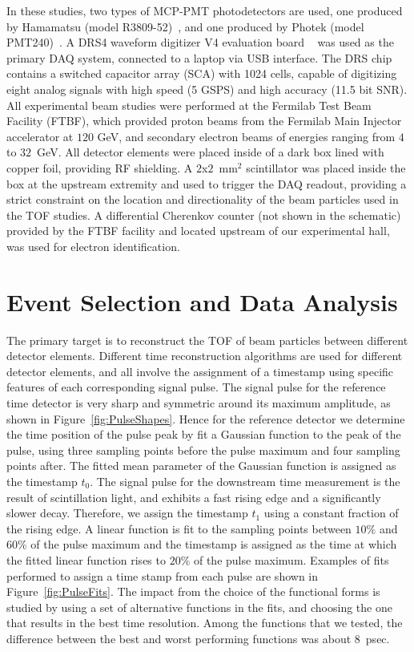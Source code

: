 In these studies, two types of MCP-PMT photodetectors are used, one produced by Hamamatsu 
(model R3809-52)~\cite{HamamatsuMCP3809}, and one produced by Photek (model
PMT240)~\cite{Photek240}. A DRS4  waveform digitizer V4 evaluation
board ~\cite{DRS4} was used as the primary DAQ system, connected to a laptop via
USB interface.  The DRS chip contains a switched capacitor array (SCA) with 1024 cells, 
capable of digitizing eight analog signals with high speed (5 GSPS) and high 
accuracy (11.5 bit SNR). All experimental beam studies were performed at the Fermilab Test
Beam Facility (FTBF), which provided proton beams from the Fermilab Main
Injector accelerator at $120$ GeV, and secondary electron beams of energies
ranging from $4$ to $32$~GeV. All detector elements were placed inside of a dark box
lined with copper foil, providing RF shielding. A $2$x$2$~$\mathrm{mm}^{2}$
scintillator was placed inside the box at the upstream extremity and used to
trigger the DAQ readout, providing a strict constraint on the
location and directionality of the beam particles used in the TOF
studies. A differential Cherenkov counter (not shown in the schematic)  provided by the FTBF
facility and located upstream of our experimental hall,  was used for electron
identification. 

\section{Event Selection and Data Analysis}

The primary target is to reconstruct the TOF of beam particles between
different detector elements. Different time reconstruction algorithms are used
for different detector elements, and all involve the assignment of a timestamp
using specific features of each corresponding signal pulse. The signal pulse for
the reference time detector is very sharp and symmetric around its maximum
amplitude, as shown in Figure~\ref{fig:PulseShapes}. Hence for the reference
detector we determine the time position of the pulse peak by fit a Gaussian
function to the peak of the pulse, using three sampling points before the pulse
maximum and four sampling points after. The fitted mean parameter of the
Gaussian function is assigned as the timestamp $t_{0}$. The signal pulse for the
downstream time measurement is the result of scintillation light, and exhibits a
fast rising edge and a significantly slower decay. Therefore, we assign the
timestamp $t_{1}$ using a constant fraction of the rising edge. A linear
function is fit to the sampling points between $10\%$ and $60\%$ of the pulse
maximum and the timestamp is assigned as the time at which the fitted linear
function rises to $20\%$ of the pulse maximum. Examples of fits performed to
assign a time stamp from each pulse are shown in Figure~\ref{fig:PulseFits}. The
impact from the choice of the functional forms is studied by using a set of
alternative functions in the fits, and choosing the one that results in the best
time resolution. Among the functions that we tested, the difference between the
best and worst performing functions was about 8~psec.

